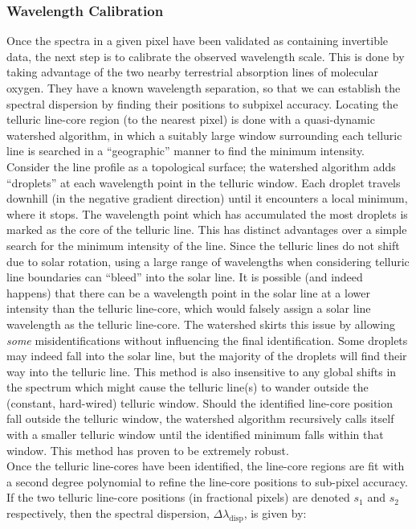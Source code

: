 \documentclass[11pt]{article}
\begin{document}
\subsubsection{Wavelength Calibration}\label{ss:wave}
Once the spectra in a given pixel have been validated as containing invertible data, the next
step is to calibrate the observed wavelength scale.  This is done by taking advantage of the 
two nearby terrestrial absorption lines of molecular oxygen.  They have a known wavelength
separation, so that we can establish the spectral dispersion by finding their positions
to subpixel accuracy.  Locating the telluric line-core region (to the nearest pixel) is 
done with a quasi-dynamic watershed algorithm, in which a suitably large window surrounding
each telluric line is searched in a ``geographic'' manner to find the minimum intensity.
Consider the line profile as a topological surface; the watershed algorithm adds ``droplets''
at each wavelength point in the telluric window.  Each droplet travels downhill (in the
negative gradient direction) until it encounters a local minimum, where it stops.  The
wavelength point which has accumulated the most droplets is marked as the core of the
telluric line.  This has distinct advantages over a simple search for the minimum intensity
of the line.  Since the telluric lines do not shift due to solar rotation, using
a large range of wavelengths when considering telluric line boundaries can ``bleed'' into
the solar line.  It is possible (and indeed happens) that there can be a wavelength point
in the solar line at a lower intensity than the telluric line-core, which would falsely
assign a solar line wavelength as the telluric line-core.  The watershed skirts this issue
by allowing \textit{some} misidentifications without influencing the final identification.
Some droplets may indeed fall into the solar line, but the majority of the droplets will
find their way into the telluric line.  This method is also insensitive to any
global shifts in the spectrum which might cause the telluric line(s) to wander outside
the (constant, hard-wired) telluric window.  Should the identified line-core position
fall outside the telluric window, the watershed algorithm recursively calls itself
with a smaller telluric window until the identified minimum falls within that window.
This method has proven to be extremely robust.\\

Once the telluric line-cores have been identified, the line-core regions are fit with a
second degree polynomial to refine the line-core positions to sub-pixel accuracy.  If
the two telluric line-core positions (in fractional pixels) are denoted $s_{1}$ and $s_{2}$
respectively, then the spectral dispersion, $\Delta\lambda_{\mathrm{disp}}$, is given by:
\end{document}
